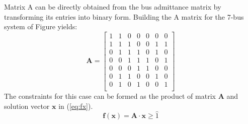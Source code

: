 \documentclass[conference]{IEEEtran}
\begin{document}
Matrix A can be directly obtained from the bus admittance matrix by transforming its entries into binary form. Building
the A matrix for the 7-bus system of Figure yields:
\begin{equation}
	\mathbf{A} = \begin{bmatrix}
		1 &1 &0 &0 &0 &0 &0 \\
		1 &1 &1 &0 &0 &1 &1 \\
		0 &1 &1 &1 &0 &1 &0 \\
		0 &0 &1 &1 &1 &0 &1 \\
		0 &0 &0 &1 &1 &0 &0 \\
		0 &1 &1 &0 &0 &1 &0 \\
		0 &1 &0 &1 &0 &0 &1 \\
	\end{bmatrix}
\label{eq:A}
\end{equation}
The constraints for this case can be formed as the product of matrix $\mathbf{A}$ and solution vector $\mathbf{x}$ in (\ref{eq:fx}).
\begin{equation}
	\mathbf{f}(\mathbf{x}) = \mathbf{A} \cdot \mathbf{x} \geq \hat{1}
	\label{eq:fx}
\end{equation}
\end{document}
